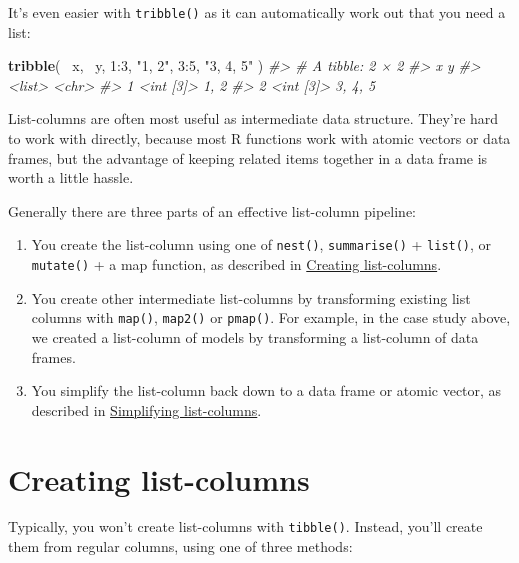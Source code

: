 \documentclass[]{book}
\newenvironment{Shaded}{\begin{snugshade}}{\end{snugshade}}
\newcommand{\KeywordTok}[1]{\textcolor[rgb]{0.13,0.29,0.53}{\textbf{{#1}}}}
\newcommand{\DecValTok}[1]{\textcolor[rgb]{0.00,0.00,0.81}{{#1}}}
\newcommand{\StringTok}[1]{\textcolor[rgb]{0.31,0.60,0.02}{{#1}}}
\newcommand{\CommentTok}[1]{\textcolor[rgb]{0.56,0.35,0.01}{\textit{{#1}}}}
\newcommand{\NormalTok}[1]{{#1}}
\begin{document}
It's even easier with \texttt{tribble()} as it can automatically work
out that you need a list:

\begin{Shaded}
\begin{Highlighting}[]
\KeywordTok{tribble}\NormalTok{(}
   \NormalTok{~x, ~y,}
  \DecValTok{1}\NormalTok{:}\DecValTok{3}\NormalTok{, }\StringTok{"1, 2"}\NormalTok{,}
  \DecValTok{3}\NormalTok{:}\DecValTok{5}\NormalTok{, }\StringTok{"3, 4, 5"}
\NormalTok{)}
\CommentTok{#> # A tibble: 2 × 2}
\CommentTok{#>           x       y}
\CommentTok{#>      <list>   <chr>}
\CommentTok{#> 1 <int [3]>    1, 2}
\CommentTok{#> 2 <int [3]> 3, 4, 5}
\end{Highlighting}
\end{Shaded}

List-columns are often most useful as intermediate data structure.
They're hard to work with directly, because most R functions work with
atomic vectors or data frames, but the advantage of keeping related
items together in a data frame is worth a little hassle.

Generally there are three parts of an effective list-column pipeline:

\begin{enumerate}
\def\labelenumi{\arabic{enumi}.}
\item
  You create the list-column using one of \texttt{nest()},
  \texttt{summarise()} + \texttt{list()}, or \texttt{mutate()} + a map
  function, as described in
  \protect\hyperlink{creating-list-columns}{Creating list-columns}.
\item
  You create other intermediate list-columns by transforming existing
  list columns with \texttt{map()}, \texttt{map2()} or \texttt{pmap()}.
  For example, in the case study above, we created a list-column of
  models by transforming a list-column of data frames.
\item
  You simplify the list-column back down to a data frame or atomic
  vector, as described in
  \protect\hyperlink{simplifying-list-columns}{Simplifying
  list-columns}.
\end{enumerate}

\hypertarget{creating-list-columns}{\section{Creating
list-columns}\label{creating-list-columns}}

Typically, you won't create list-columns with \texttt{tibble()}.
Instead, you'll create them from regular columns, using one of three
methods:
\end{document}
